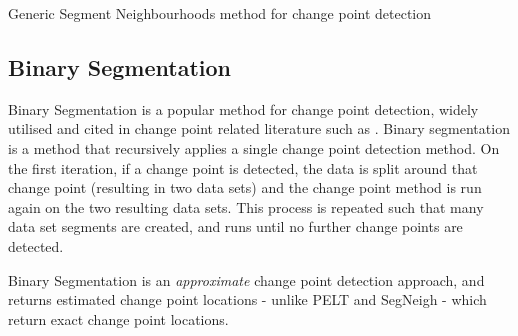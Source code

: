 \documentclass{uvamscse}	%
\begin{document}
\begin{algorithm}[H]
\label{alg:segneigh}
    \caption{Generic Segment Neighbourhoods method for change point detection}
    \DontPrintSemicolon
        
        
\end{algorithm}

\subsection{Binary Segmentation}

Binary Segmentation \cite{Jackson2003} \cite{Yao1984} is a popular method for change point detection, widely utilised and cited in change point related literature such as . Binary segmentation is a method that recursively applies a single change point detection method. On the first iteration, if a change point is detected, the data is split around that change point (resulting in two data sets) and the change point method is run again on the two resulting data sets. This process is repeated such that many data set segments are created, and runs until no further change points are detected.

Binary Segmentation is an \emph{approximate} change point detection approach, and returns estimated change point locations - unlike PELT and SegNeigh - which return exact change point locations.
\end{document}
